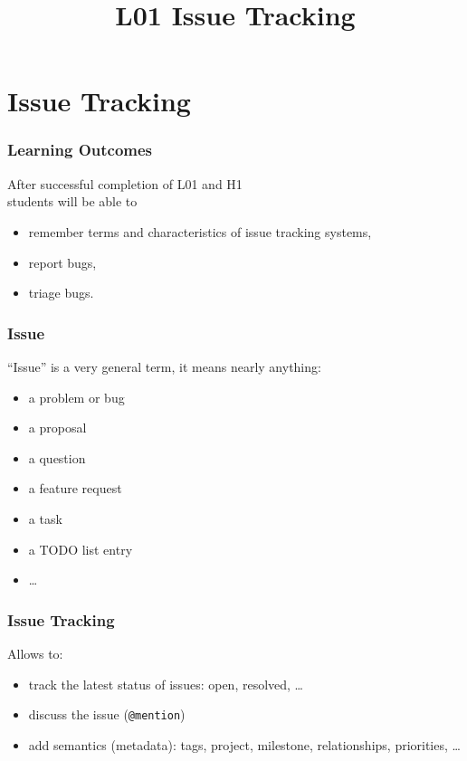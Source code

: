 

\title{L01 Issue Tracking}
\date{}



\section{Issue Tracking}

\begin{frame}
	\frametitle{Learning Outcomes}
	After successful completion of L01 and H1 \\
	students will be able to

	\begin{itemize}
	\item remember terms and characteristics of issue tracking systems,
	\item report bugs,
	\item triage bugs.
	\end{itemize}
\end{frame}

\begin{frame}
	\frametitle{Issue}

	``Issue'' is a very general term, it means nearly anything:

	\begin{itemize}
		\item a problem or bug
		\item a proposal
		\item a question
		\item a feature request
		\item a task
		\item a TODO list entry
		\item \dots
	\end{itemize}
\end{frame}

\begin{frame}[fragile]
	\frametitle{Issue Tracking}

	Allows to:

	\begin{itemize}
		\item track the latest status of issues: open, resolved, \dots
		\item discuss the issue (\verb+@mention+)
		\item add semantics (metadata): tags, project, milestone, relationships, priorities, \dots
	\end{itemize}
\end{frame}


